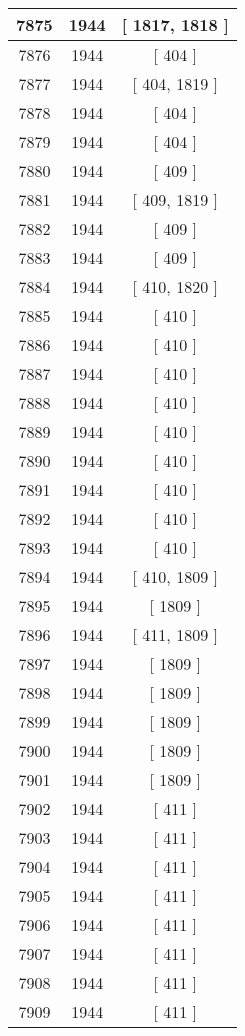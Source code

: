 \begin{center}
\begin{longtable}[H]{|| c c c ||}
\hline
7875 & 1944 & [ 1817, 1818 ] \\ 
\hline
7876 & 1944 & [ 404 ] \\ 
\hline
7877 & 1944 & [ 404, 1819 ] \\ 
\hline
7878 & 1944 & [ 404 ] \\ 
\hline
7879 & 1944 & [ 404 ] \\ 
\hline
7880 & 1944 & [ 409 ] \\ 
\hline
7881 & 1944 & [ 409, 1819 ] \\ 
\hline
7882 & 1944 & [ 409 ] \\ 
\hline
7883 & 1944 & [ 409 ] \\ 
\hline
7884 & 1944 & [ 410, 1820 ] \\ 
\hline
7885 & 1944 & [ 410 ] \\ 
\hline
7886 & 1944 & [ 410 ] \\ 
\hline
7887 & 1944 & [ 410 ] \\ 
\hline
7888 & 1944 & [ 410 ] \\ 
\hline
7889 & 1944 & [ 410 ] \\ 
\hline
7890 & 1944 & [ 410 ] \\ 
\hline
7891 & 1944 & [ 410 ] \\ 
\hline
7892 & 1944 & [ 410 ] \\ 
\hline
7893 & 1944 & [ 410 ] \\ 
\hline
7894 & 1944 & [ 410, 1809 ] \\ 
\hline
7895 & 1944 & [ 1809 ] \\ 
\hline
7896 & 1944 & [ 411, 1809 ] \\ 
\hline
7897 & 1944 & [ 1809 ] \\ 
\hline
7898 & 1944 & [ 1809 ] \\ 
\hline
7899 & 1944 & [ 1809 ] \\ 
\hline
7900 & 1944 & [ 1809 ] \\ 
\hline
7901 & 1944 & [ 1809 ] \\ 
\hline
7902 & 1944 & [ 411 ] \\ 
\hline
7903 & 1944 & [ 411 ] \\ 
\hline
7904 & 1944 & [ 411 ] \\ 
\hline
7905 & 1944 & [ 411 ] \\ 
\hline
7906 & 1944 & [ 411 ] \\ 
\hline
7907 & 1944 & [ 411 ] \\ 
\hline
7908 & 1944 & [ 411 ] \\ 
\hline
7909 & 1944 & [ 411 ] \\ 
\hline

\end{longtable}
\end{center}
